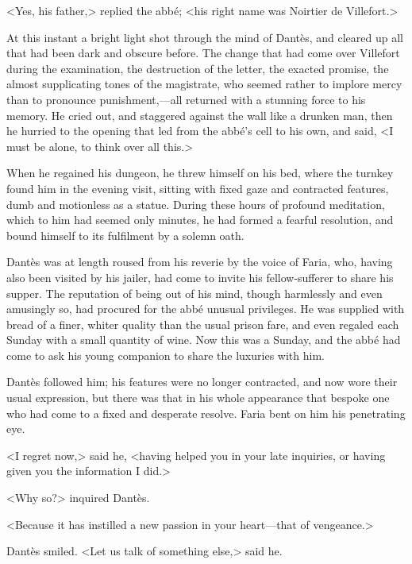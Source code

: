  <Yes, his father,> replied the abbé; <his right name was Noirtier de Villefort.> 

 At this instant a bright light shot through the mind of Dantès, and cleared up all that had been dark and obscure before. The change that had come over Villefort during the examination, the destruction of the letter, the exacted promise, the almost supplicating tones of the magistrate, who seemed rather to implore mercy than to pronounce punishment,—all returned with a stunning force to his memory. He cried out, and staggered against the wall like a drunken man, then he hurried to the opening that led from the abbé's cell to his own, and said, <I must be alone, to think over all this.> 

 When he regained his dungeon, he threw himself on his bed, where the turnkey found him in the evening visit, sitting with fixed gaze and contracted features, dumb and motionless as a statue. During these hours of profound meditation, which to him had seemed only minutes, he had formed a fearful resolution, and bound himself to its fulfilment by a solemn oath. 

 Dantès was at length roused from his reverie by the voice of Faria, who, having also been visited by his jailer, had come to invite his fellow-sufferer to share his supper. The reputation of being out of his mind, though harmlessly and even amusingly so, had procured for the abbé unusual privileges. He was supplied with bread of a finer, whiter quality than the usual prison fare, and even regaled each Sunday with a small quantity of wine. Now this was a Sunday, and the abbé had come to ask his young companion to share the luxuries with him. 

 Dantès followed him; his features were no longer contracted, and now wore their usual expression, but there was that in his whole appearance that bespoke one who had come to a fixed and desperate resolve. Faria bent on him his penetrating eye. 

 <I regret now,> said he, <having helped you in your late inquiries, or having given you the information I did.> 

 <Why so?> inquired Dantès. 

 <Because it has instilled a new passion in your heart—that of vengeance.> 

 Dantès smiled. <Let us talk of something else,> said he. 

